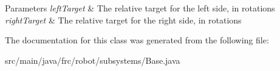 \begin{DoxyParams}{Parameters}
{\em left\+Target} & The relative target for the left side, in rotations \\
\hline
{\em right\+Target} & The relative target for the right side, in rotations \\
\hline
\end{DoxyParams}


The documentation for this class was generated from the following file\+:\begin{DoxyCompactItemize}
\item 
src/main/java/frc/robot/subsystems/Base.\+java\end{DoxyCompactItemize}
